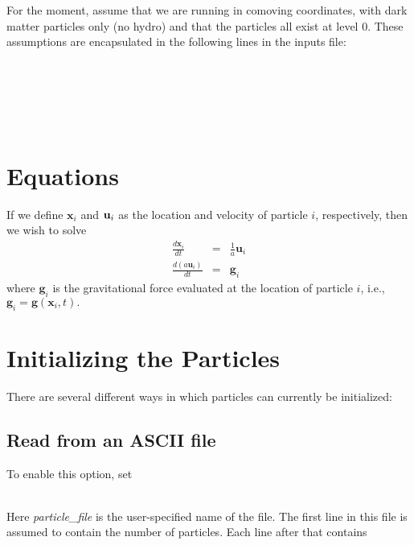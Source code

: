 For the moment, assume that we are running in comoving coordinates, 
with dark matter particles only (no hydro) and that the particles all exist at level 0.   These assumptions are
encapsulated in the following lines in the inputs file: \\

 \\
 \\
 \\
 \\
 \\

\section{Equations}

If we define ${\mathbf x}_i$ and ${\bf u}_i$ as the location and velocity of particle $i$, respectively, then we wish
to solve
\begin{eqnarray}
\frac{d {\mathbf x}_i}{d t} &=& \frac{1}{a} {\mathbf u}_i \\
\frac{d (a {\mathbf u}_i) }{d t} &=& {\mathbf g}_i
\end{eqnarray}
where ${\mathbf g}_i$ is the gravitational force evaluated at the location of particle $i$, i.e., 
${\mathbf g}_i = {\mathbf g}({\mathbf x}_i,t).$

\section{Initializing the Particles}

\noindent There are several different ways in which particles can currently be initialized:

\subsection{Read from an ASCII file}

To enable this option, set \\

 \\

Here {\em particle\_file} is the user-specified name of the file.  The first line in this file is
assumed to contain the number of particles.  Each line after that contains  \\


